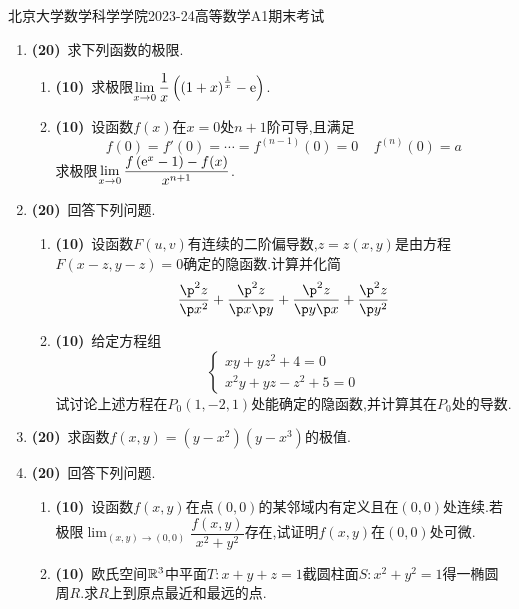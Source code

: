 \documentclass{ctexart}
\begin{document}
\pagestyle{empty}

\begin{center}\Large
    北京大学数学科学学院2023-24高等数学A1期末考试
\end{center}
\begin{enumerate}[leftmargin=*,label=\textbf{\arabic*.}]
    \item \textbf{(20)}\ 求下列函数的极限.
        \begin{enumerate}[label=\tbf{(\arabic*)}]
            \item \textbf{(10)}\ 求极限$\displaystyle\lim_{x\to0}\dfrac1x\left(\left(1+x\right)^{\frac1x}-\mathrm{e}\right)$.
            \item \textbf{(10)}\ 设函数$f(x)$在$x=0$处$n+1$阶可导,且满足\[f(0)=f'(0)=\cdots=f^{(n-1)}(0)=0\ \ \ \ \ f^{(n)}(0)=a\]求极限$\displaystyle\lim_{x\to0}\dfrac{f\left(\mathrm{e}^x-1\right)-f(x)}{x^{n+1}}$.
        \end{enumerate}
    \item \textbf{(20)}\ 回答下列问题.
        \begin{enumerate}[label=\tbf{(\arabic*)}]
            \item \textbf{(10)}\ 设函数$F(u,v)$有连续的二阶偏导数,$z=z(x,y)$是由方程$F(x-z,y-z)=0$确定的隐函数.计算并化简
                \[\dfrac{\p^2z}{\p x^2}+\dfrac{\p^2z}{\p x\p y}+\dfrac{\p^2z}{\p y\p x}+\dfrac{\p^2z}{\p y^2}\]
            \item \textbf{(10)}\ 给定方程组
                \[\left\{\begin{array}{l}
                    xy+yz^2+4=0\\
                    x^2y+yz-z^2+5=0
                \end{array}\right.\]
                试讨论上述方程在$P_0\left(1,-2,1\right)$处能确定的隐函数,并计算其在$P_0$处的导数.
        \end{enumerate}
    \item \textbf{(20)}\ 求函数$f(x,y)=\left(y-x^2\right)\left(y-x^3\right)$的极值.
    \item \textbf{(20)}\ 回答下列问题.
        \begin{enumerate}[label=\tbf{(\arabic*)}]
            \item \textbf{(10)}\ 设函数$f(x,y)$在点$(0,0)$的某邻域内有定义且在$(0,0)$处连续.若极限$\displaystyle\lim_{(x,y)\to(0,0)}\dfrac{f(x,y)}{x^2+y^2}$存在,试证明$f(x,y)$在$(0,0)$处可微.
            \item \textbf{(10)}\ 欧氏空间$\mathbb{R}^3$中平面$T:x+y+z=1$截圆柱面$S:x^2+y^2=1$得一椭圆周$R$.求$R$上到原点最近和最远的点.

\end{enumerate}
\end{enumerate}
\end{document}
